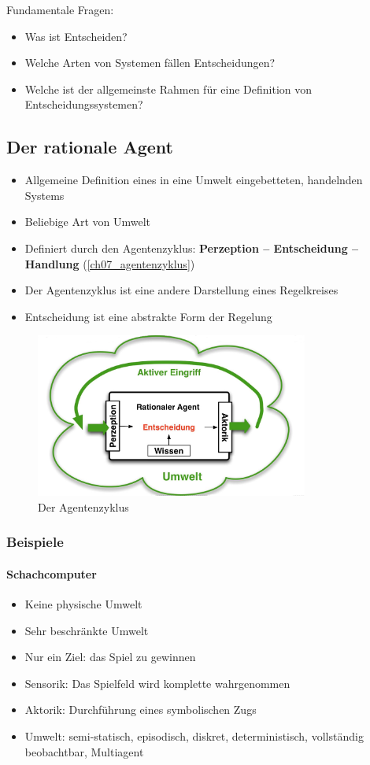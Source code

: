 Fundamentale Fragen:
\begin{itemize}
	\item Was ist Entscheiden?
	\item Welche Arten von Systemen fällen Entscheidungen?
	\item Welche ist der allgemeinste Rahmen für eine Definition von Entscheidungssystemen?
\end{itemize}

\subsection{Der rationale Agent}
\begin{itemize}
	\item Allgemeine Definition eines in eine Umwelt eingebetteten, handelnden Systems
	\item Beliebige Art von Umwelt
	\item Definiert durch den Agentenzyklus: \textbf{Perzeption -- Entscheidung -- Handlung} (\autoref{ch07_agentenzyklus})
	\item Der Agentenzyklus ist eine andere Darstellung eines Regelkreises
	\item Entscheidung ist eine abstrakte Form der Regelung
\end{itemize}

\begin{figure}[ht]\centering 
\includegraphics[width=0.8\textwidth]{figures/07_agentenzyklus.png}
\caption{Der Agentenzyklus}
\label{ch07_agentenzyklus}
\end{figure}

\subsubsection{Beispiele}
\paragraph{Schachcomputer}
\begin{itemize}
	\item Keine physische Umwelt
	\item Sehr beschränkte Umwelt
	\item Nur ein Ziel: das Spiel zu gewinnen
	\item Sensorik: Das Spielfeld wird komplette wahrgenommen
	\item Aktorik: Durchführung eines symbolischen Zugs
	\item Umwelt: semi-statisch, episodisch, diskret, deterministisch, vollständig beobachtbar, Multiagent
\end{itemize}
